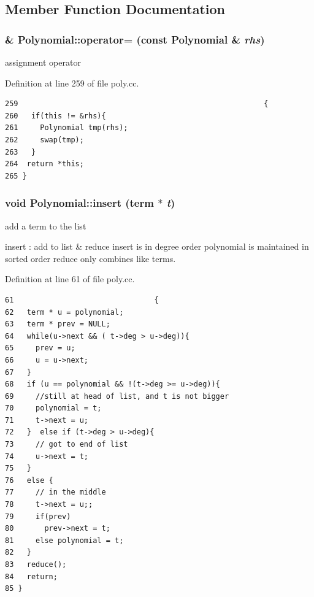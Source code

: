 \subsection{Member Function Documentation}
\hypertarget{classPolynomial_76d719fc2a24feb250ee2dbddcb6c8bb}{
\subsubsection[operator=]{ \& Polynomial::operator= (const {\bf Polynomial} \& {\em rhs})}}
\label{classPolynomial_76d719fc2a24feb250ee2dbddcb6c8bb}


assignment operator 

Definition at line 259 of file poly.cc.

\begin{Code}\begin{verbatim}259                                                        {
260   if(this != &rhs){
261     Polynomial tmp(rhs);
262     swap(tmp);
263   }
264  return *this;
265 }
\end{verbatim}
\end{Code}


\hypertarget{classPolynomial_b141080a5700f160d4bd1d68cecfd50f}{
\subsubsection[insert]{\setlength{\rightskip}{0pt plus 5cm}void Polynomial::insert (term $\ast$ {\em t})}}
\label{classPolynomial_b141080a5700f160d4bd1d68cecfd50f}


add a term to the list

insert : add to list \& reduce insert is in degree order polynomial is maintained in sorted order reduce only combines like terms. 

Definition at line 61 of file poly.cc.

\begin{Code}\begin{verbatim}61                                {
62   term * u = polynomial;
63   term * prev = NULL;
64   while(u->next && ( t->deg > u->deg)){
65     prev = u;
66     u = u->next;
67   }
68   if (u == polynomial && !(t->deg >= u->deg)){
69     //still at head of list, and t is not bigger
70     polynomial = t;
71     t->next = u;
72   }  else if (t->deg > u->deg){
73     // got to end of list
74     u->next = t;
75   }
76   else {
77     // in the middle
78     t->next = u;;
79     if(prev)
80       prev->next = t;
81     else polynomial = t;
82   }
83   reduce();
84   return;
85 }
\end{verbatim}
\end{Code}




